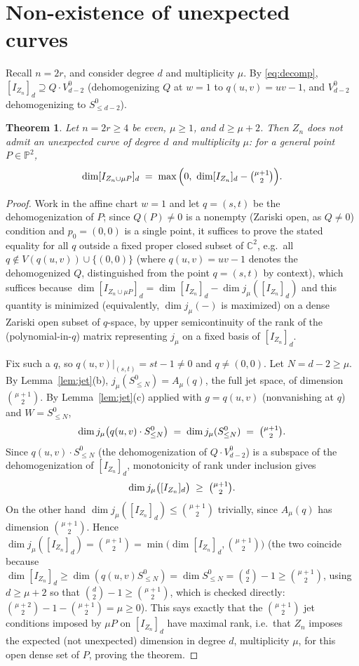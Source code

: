 \documentclass[11pt]{amsart}
\theoremstyle{plain}
\newtheorem{theorem}{Theorem}[section]
\theoremstyle{definition}
\newcommand{\PP}{\mathbb{P}}
\newcommand{\CC}{\mathbb{C}}
\begin{document}
\section{Non-existence of unexpected curves}\label{sec:main}

Recall $n=2r$, and consider degree $d$ and multiplicity $\mu$. By \eqref{eq:decomp}, $[I_{Z_n}]_d \supseteq Q\cdot V^0_{d-2}$ (dehomogenizing $Q$ at $w=1$ to $q(u,v)=uv-1$, and $V^0_{d-2}$ dehomogenizing to $S^0_{\le d-2}$).

\begin{theorem}\label{thm:main}
Let $n=2r\ge4$ be even, $\mu\ge1$, and $d\ge\mu+2$. Then $Z_n$ does not admit an unexpected curve of degree $d$ and multiplicity $\mu$: for a general point $P\in\PP^2$,
\[
\dim[I_{Z_n\cup \mu P}]_d \;=\; \max\Big(0,\ \dim[I_{Z_n}]_d - \tbinom{\mu+1}2\Big).
\]
\end{theorem}

\begin{proof}
Work in the affine chart $w=1$ and let $q=(s,t)$ be the dehomogenization of $P$; since $Q(P)\ne0$ is a nonempty (Zariski open, as $Q\ne0$) condition and $p_0=(0,0)$ is a single point, it suffices to prove the stated equality for all $q$ outside a fixed proper closed subset of $\CC^2$, e.g.\ all $q\notin V(q(u,v))\cup\{(0,0)\}$ (where $q(u,v)=uv-1$ denotes the dehomogenized $Q$, distinguished from the point $q=(s,t)$ by context), which suffices because $\dim[I_{Z_n\cup \mu P}]_d = \dim [I_{Z_n}]_d - \dim j_\mu([I_{Z_n}]_d)$ and this quantity is minimized (equivalently, $\dim j_\mu(-)$ is maximized) on a dense Zariski open subset of $q$-space, by upper semicontinuity of the rank of the (polynomial-in-$q$) matrix representing $j_\mu$ on a fixed basis of $[I_{Z_n}]_d$.

Fix such a $q$, so $q(u,v)\big|_{(s,t)} = st-1 \ne0$ and $q\ne(0,0)$. Let $N=d-2\ge\mu$. By Lemma~\ref{lem:jet}(b), $j_\mu(S^0_{\le N})=A_\mu(q)$, the full jet space, of dimension $\binom{\mu+1}2$. By Lemma~\ref{lem:jet}(c) applied with $g=q(u,v)$ (nonvanishing at $q$) and $W=S^0_{\le N}$,
\[
\dim j_\mu\big(q(u,v)\cdot S^0_{\le N}\big) \;=\; \dim j_\mu(S^0_{\le N}) \;=\; \tbinom{\mu+1}{2}.
\]
Since $q(u,v)\cdot S^0_{\le N}$ (the dehomogenization of $Q\cdot V^0_{d-2}$) is a subspace of the dehomogenization of $[I_{Z_n}]_d$, monotonicity of rank under inclusion gives
\[
\dim j_\mu\big([I_{Z_n}]_d\big) \;\ge\; \tbinom{\mu+1}{2}.
\]
On the other hand $\dim j_\mu([I_{Z_n}]_d)\le \binom{\mu+1}2$ trivially, since $A_\mu(q)$ has dimension $\binom{\mu+1}2$. Hence $\dim j_\mu([I_{Z_n}]_d) = \binom{\mu+1}{2} = \min\big(\dim[I_{Z_n}]_d, \binom{\mu+1}2\big)$ (the two coincide because $\dim[I_{Z_n}]_d\ge\dim (q(u,v)S^0_{\le N})=\dim S^0_{\le N} = \binom{d}2 -1\ge \binom{\mu+1}2$, using $d\ge \mu+2$ so that $\binom{d}2-1\ge\binom{\mu+1}2$, which is checked directly: $\binom{\mu+2}{2}-1-\binom{\mu+1}2 = \mu\ge0$). This says exactly that the $\binom{\mu+1}2$ jet conditions imposed by $\mu P$ on $[I_{Z_n}]_d$ have maximal rank, i.e.\ that $Z_n$ imposes the expected (not unexpected) dimension in degree $d$, multiplicity $\mu$, for this open dense set of $P$, proving the theorem.
\end{proof}
\end{document}
